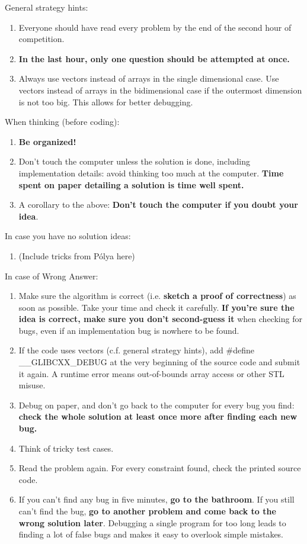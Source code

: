      General strategy hints:
      \begin{enumerate}
        \item Everyone should have read every problem by the end of the second hour of competition.
        \item \textbf{In the last hour, only one question should be attempted at once.}
        \item Always use vectors instead of arrays in the single dimensional case. Use vectors instead of arrays in the bidimensional case if the outermost dimension is not too big. This allows for better debugging.
      \end{enumerate}

      When thinking (before coding):
      \begin{enumerate}
        \item \textbf{Be organized!}
        \item Don't touch the computer unless the solution is done, including implementation details: avoid thinking too much at the computer. \textbf{Time spent on paper detailing a solution is time well spent.}
        \item A corollary to the above: \textbf{Don't touch the computer if you doubt your idea}.
      \end{enumerate}

      In case you have no solution ideas:
      \begin{enumerate}
        \item (Include tricks from Pólya here)
      \end{enumerate}

      In case of Wrong Answer:
      \begin{enumerate}
        \item Make sure the algorithm is correct (i.e. \textbf{sketch a proof of correctness}) as soon as possible. Take your time and check it carefully. \textbf{If you're sure the idea is correct, make sure you don't second-guess it} when checking for bugs, even if an implementation bug is nowhere to be found.
        \item If the code uses vectors (c.f. general strategy hints), add \#define \_\_GLIBCXX\_DEBUG at the very beginning of the source code and submit it again. A runtime error means out-of-bounds array access or other STL misuse.
        \item Debug on paper, and don't go back to the computer for every bug you find: \textbf{check the whole solution at least once more after finding each new bug.}
        \item Think of tricky test cases.
        \item Read the problem again. For every constraint found, check the printed source code.
        \item If you can't find any bug in five minutes, \textbf{go to the bathroom}. If you still can't find the bug, \textbf{go to another problem and come back to the wrong solution later}. Debugging a single program for too long leads to finding a lot of false bugs and makes it easy to overlook simple mistakes.
      \end{enumerate}

